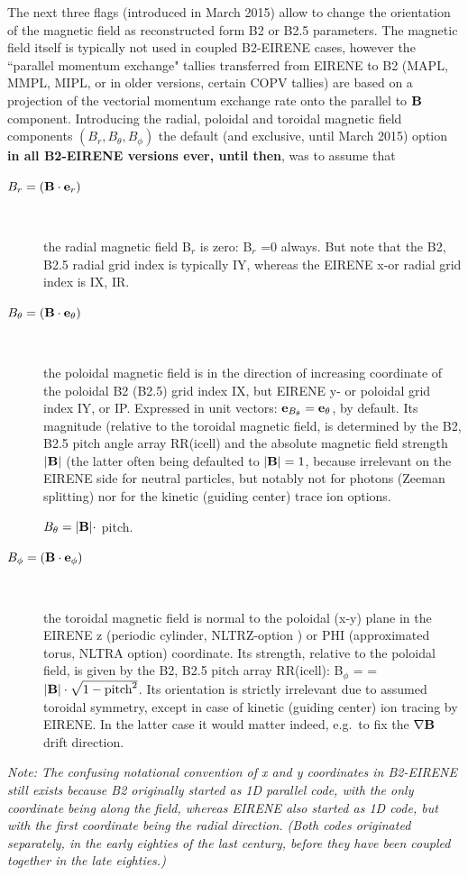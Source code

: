 The next three flags (introduced in March 2015) allow to change the orientation
of the magnetic field as reconstructed form B2 or B2.5 parameters.
The magnetic field itself is typically not used in coupled B2-EIRENE cases,
however the ``parallel momentum exchange" tallies transferred from EIRENE to B2
(MAPL, MMPL, MIPL, or in older versions, certain COPV tallies) are based on a
projection of the vectorial momentum exchange rate onto the parallel to $\mathbf{B}$
component.
Introducing the radial, poloidal and toroidal magnetic field components
$(B_r,B_\theta,B_\phi)$ the default (and exclusive, until March 2015) option
\textbf{in all B2-EIRENE versions ever, until then}, was to assume that
\begin{description}
  \item[$B_r = (\mathbf{B} \cdot \mathbf{e}_r)$] ~

        the radial magnetic field B$_r$ is zero: B$_r$ =0 always.
        But note that the B2, B2.5 radial grid index is typically IY, whereas the
        EIRENE x-or radial grid index is IX, IR.

  \item[$B_\theta = (\mathbf{B} \cdot \mathbf{e}_\theta)$] ~

        the poloidal magnetic field is in the direction of increasing coordinate of the
        poloidal B2 (B2.5) grid index IX, but EIRENE y- or poloidal grid index IY, or
        IP.
        Expressed in unit vectors: $\mathbf{e}_{B_\theta} = \mathbf{e}_\theta$, by default.
        Its magnitude (relative to the toroidal magnetic field, is determined by the
        B2, B2.5 pitch angle array RR(icell) and the absolute magnetic field strength
        $|\mathbf{B}|$ (the latter often being defaulted to $|\mathbf{B}|=1$, because irrelevant on
        the EIRENE side for neutral particles, but notably not for photons (Zeeman
        splitting) nor for the kinetic (guiding center) trace ion options.

        $B_\theta = |\mathbf{B}| \cdot $ pitch.
  \item[$B_\phi = (\mathbf{B} \cdot \mathbf{e}_\phi)$] ~

        the toroidal magnetic field is normal to the poloidal (x-y) plane in the EIRENE
        z (periodic cylinder, NLTRZ-option ) or PHI (approximated torus, NLTRA option)
        coordinate.
        Its strength, relative to the poloidal field, is given by the B2, B2.5 pitch
        array RR(icell):
        B$_\phi$ = = $|\mathbf{B}| \cdot \sqrt{1-\mbox{pitch}^2}$.
        Its orientation is strictly irrelevant due to assumed toroidal symmetry, except
        in case of kinetic (guiding center) ion tracing by EIRENE.
        In the latter case it would matter indeed, e.g.\ to fix the $\nabla \mathbf{B}$ drift
        direction.
\end{description}
\emph{Note: The confusing notational convention of x and y coordinates in
  B2-EIRENE still exists because B2 originally started as 1D parallel code, with
  the only coordinate being along the field, whereas EIRENE also started as 1D
  code, but with the first coordinate being the radial direction.
  (Both codes originated separately, in the early eighties of the last century,
  before they have been coupled together in the late eighties.)}

